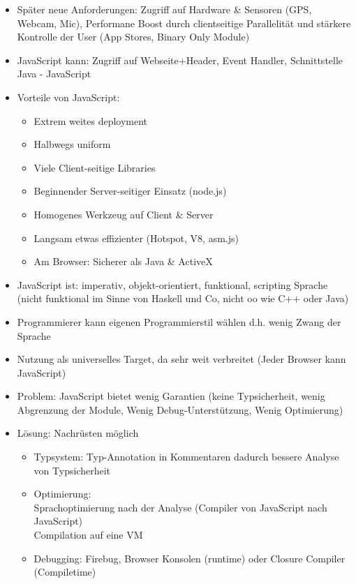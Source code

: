\documentclass{article} %
\begin{document}
\begin{itemize}
		\item Später neue Anforderungen: Zugriff auf Hardware \& Sensoren (GPS, Webcam, Mic), Performane Boost durch clientseitige Parallelität und stärkere Kontrolle der User (App Stores, Binary Only Module)
		\item JavaScript kann: Zugriff auf Webseite+Header, Event Handler, Schnittstelle Java - JavaScript
		\item Vorteile von JavaScript:
		\begin{itemize}
			\item Extrem weites deployment
			\item Halbwegs uniform 
			\item Viele Client-seitige Libraries
			\item Beginnender Server-seitiger Einsatz (node.js)
			\item Homogenes Werkzeug auf Client \& Server
			\item Langsam etwas effizienter (Hotspot, V8, asm.js)
			\item Am Browser: Sicherer als Java \& ActiveX 
		\end{itemize}
		\item JavaScript ist: imperativ, objekt-orientiert, funktional, scripting Sprache (nicht funktional im Sinne von Haskell und Co, nicht oo wie C++ oder Java)
		\item Programmierer kann eigenen Programmierstil wählen d.h. wenig Zwang der Sprache 
		\item Nutzung als universelles Target, da sehr weit verbreitet (Jeder Browser kann JavaScript)
		\item Problem: JavaScript bietet wenig Garantien (keine Typsicherheit, wenig Abgrenzung der Module, Wenig Debug-Unterstützung, Wenig Optimierung)
		\item Lösung: Nachrüsten möglich 
		\begin{itemize}
			\item Typsystem: Typ-Annotation in Kommentaren dadurch bessere Analyse von Typsicherheit
			\item Optimierung: \\
			Sprachoptimierung nach der Analyse (Compiler von JavaScript nach JavaScript)\\
			Compilation auf eine VM
			\item Debugging: Firebug, Browser Konsolen (runtime) oder Closure Compiler (Compiletime)
		\end{itemize}


\end{itemize}
\end{document}
